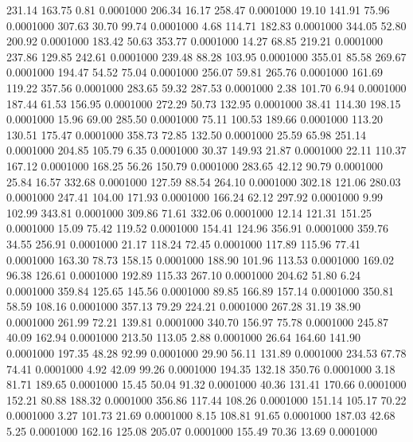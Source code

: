  231.14  163.75    0.81   0.0001000
 206.34   16.17  258.47   0.0001000
  19.10  141.91   75.96   0.0001000
 307.63   30.70   99.74   0.0001000
   4.68  114.71  182.83   0.0001000
 344.05   52.80  200.92   0.0001000
 183.42   50.63  353.77   0.0001000
  14.27   68.85  219.21   0.0001000
 237.86  129.85  242.61   0.0001000
 239.48   88.28  103.95   0.0001000
 355.01   85.58  269.67   0.0001000
 194.47   54.52   75.04   0.0001000
 256.07   59.81  265.76   0.0001000
 161.69  119.22  357.56   0.0001000
 283.65   59.32  287.53   0.0001000
   2.38  101.70    6.94   0.0001000
 187.44   61.53  156.95   0.0001000
 272.29   50.73  132.95   0.0001000
  38.41  114.30  198.15   0.0001000
  15.96   69.00  285.50   0.0001000
  75.11  100.53  189.66   0.0001000
 113.20  130.51  175.47   0.0001000
 358.73   72.85  132.50   0.0001000
  25.59   65.98  251.14   0.0001000
 204.85  105.79    6.35   0.0001000
  30.37  149.93   21.87   0.0001000
  22.11  110.37  167.12   0.0001000
 168.25   56.26  150.79   0.0001000
 283.65   42.12   90.79   0.0001000
  25.84   16.57  332.68   0.0001000
 127.59   88.54  264.10   0.0001000
 302.18  121.06  280.03   0.0001000
 247.41  104.00  171.93   0.0001000
 166.24   62.12  297.92   0.0001000
   9.99  102.99  343.81   0.0001000
 309.86   71.61  332.06   0.0001000
  12.14  121.31  151.25   0.0001000
  15.09   75.42  119.52   0.0001000
 154.41  124.96  356.91   0.0001000
 359.76   34.55  256.91   0.0001000
  21.17  118.24   72.45   0.0001000
 117.89  115.96   77.41   0.0001000
 163.30   78.73  158.15   0.0001000
 188.90  101.96  113.53   0.0001000
 169.02   96.38  126.61   0.0001000
 192.89  115.33  267.10   0.0001000
 204.62   51.80    6.24   0.0001000
 359.84  125.65  145.56   0.0001000
  89.85  166.89  157.14   0.0001000
 350.81   58.59  108.16   0.0001000
 357.13   79.29  224.21   0.0001000
 267.28   31.19   38.90   0.0001000
 261.99   72.21  139.81   0.0001000
 340.70  156.97   75.78   0.0001000
 245.87   40.09  162.94   0.0001000
 213.50  113.05    2.88   0.0001000
  26.64  164.60  141.90   0.0001000
 197.35   48.28   92.99   0.0001000
  29.90   56.11  131.89   0.0001000
 234.53   67.78   74.41   0.0001000
   4.92   42.09   99.26   0.0001000
 194.35  132.18  350.76   0.0001000
   3.18   81.71  189.65   0.0001000
  15.45   50.04   91.32   0.0001000
  40.36  131.41  170.66   0.0001000
 152.21   80.88  188.32   0.0001000
 356.86  117.44  108.26   0.0001000
 151.14  105.17   70.22   0.0001000
   3.27  101.73   21.69   0.0001000
   8.15  108.81   91.65   0.0001000
 187.03   42.68    5.25   0.0001000
 162.16  125.08  205.07   0.0001000
 155.49   70.36   13.69   0.0001000
